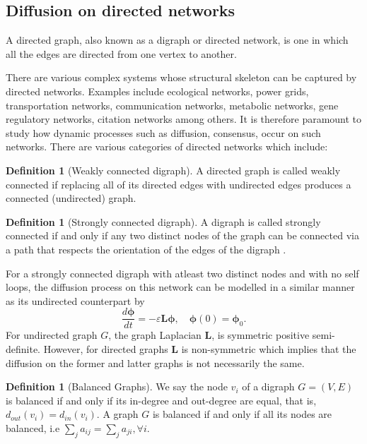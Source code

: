 \documentclass[10pt,a4paper]{article}
\theoremstyle{plain}
\theoremstyle{definition}
\newtheorem{defn}[subsection]{Definition}
\begin{document}
     \newpage
     
        \subsection{Diffusion on directed networks}
        A directed graph, also known as a digraph or directed network, is one in which all the edges are directed from one vertex to another. 
        
        There are various complex systems whose structural skeleton can be captured by directed networks. Examples include ecological  networks, power grids, transportation networks, communication networks, metabolic networks, gene regulatory networks, citation networks among others. It is therefore paramount to study how dynamic processes such as diffusion, consensus, occur on such networks. There are various categories of directed networks which include:\\
        
        \begin{defn}[Weakly connected digraph]
        	A directed graph is called weakly connected if replacing all of its directed edges with undirected edges produces a connected (undirected) graph.\\
          \end{defn}   
        \begin{defn}[Strongly connected digraph]
        	A digraph is called strongly connected if and only if any two distinct nodes of the graph can be connected via a path that respects the orientation of the edges of the digraph \citep{saber2003agreement}.\\
        \end{defn}        
        For a strongly connected digraph with atleast two distinct nodes and with no self loops, the diffusion process on this network can be modelled in a similar manner as its undirected counterpart by 
        \begin{equation}
        \frac{d\boldsymbol{\phi}}{dt} = -\varepsilon\mathbf{L}\boldsymbol{\phi}, \quad \boldsymbol{\phi}(0) = \boldsymbol{\phi}_0.
        \end{equation}
        For undirected graph $G$, the graph Laplacian  $\mathbf{L}$, is symmetric positive semi-definite. However, for directed graphs $\mathbf{L}$ is non-symmetric which implies that the diffusion on the former and latter graphs is not necessarily the same.\\
        
         \begin{defn}[Balanced Graphs]
        	We say the node $v_i$ of a digraph $G=(V,E)$ is balanced if and only if its in-degree and out-degree are equal, that is, $d_{out}(v_i) =d_{in}(v_i)$. A graph $G$ is balanced if and only if all its nodes are balanced, i.e $\sum_j a_{ij} = \sum_j a_{ji}, \forall i$. 
        \end{defn}
        
\end{document}
